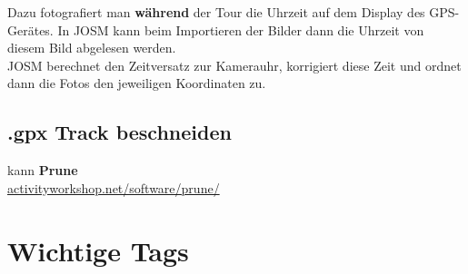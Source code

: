 \documentclass[a4paper,11pt,notumble]{leaflet}
\begin{document}
Dazu fotografiert man \textbf{während} der Tour die Uhrzeit auf dem Display des GPS-Gerätes.  
In JOSM kann beim Importieren der Bilder dann die Uhrzeit von diesem Bild abgelesen werden. \\
JOSM berechnet den Zeitversatz zur Kamerauhr, korrigiert diese Zeit und ordnet dann die Fotos den jeweiligen Koordinaten zu. \\

\subsection*{.gpx Track beschneiden} kann \textbf{Prune} \\
\href{http://activityworkshop.net/software/prune/}{activityworkshop.net/software/prune/}

\section*{Wichtige Tags}
\end{document}
